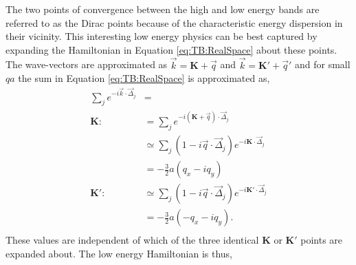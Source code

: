 The two points of convergence between the high and low energy bands are referred to as the Dirac points because of the characteristic energy dispersion in their vicinity.
This interesting low energy physics can be best captured by expanding the Hamiltonian in Equation \ref{eq:TB:RealSpace} about these points.
The wave-vectors are approximated as $\vec{k}=\bm{K}+\vec{q}$ and $\vec{k}=\bm{K'}+\vec{q}'$ and for small $qa$ the sum in Equation \ref{eq:TB:RealSpace} is approximated as,
\begin{align*}
	\sum_{j} e^{-i \vec{k} \cdot \vec{\Delta}_j}&= \\
	\bm{K:}\ 	&=\sum_{j} e^{-i (\bm{K}+\vec{q}) \cdot \vec{\Delta}_j} \\
				&\simeq \sum_{j} (1-i \vec{q} \cdot \vec{\Delta}_j) e^{-i \bm{K} \cdot \vec{\Delta}_j} \\
				&=-\frac{3}{2} a \left( q_x-i q_y \right) \\
	\bm{K':}\	&\simeq \sum_{j} (1-i \vec{q} \cdot \vec{\Delta}_j) e^{-i \bm{K'} \cdot \vec{\Delta}_j} \\
				&=-\frac{3}{2} a \left(-q_x-i q_y \right) . \\
\end{align*}
These values are independent of which of the three identical $\bm{K}$ or $\bm{K'}$ points are expanded about.
The low energy Hamiltonian is thus,
